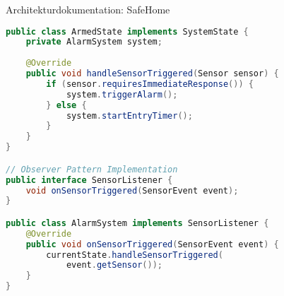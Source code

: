 \begin{example2}[breakable]{Architekturdokumentation: SafeHome}
\begin{lstlisting}[language=Java, style=basesmol]
public class ArmedState implements SystemState {
    private AlarmSystem system;
    
    @Override
    public void handleSensorTriggered(Sensor sensor) {
        if (sensor.requiresImmediateResponse()) {
            system.triggerAlarm();
        } else {
            system.startEntryTimer();
        }
    }
}

// Observer Pattern Implementation
public interface SensorListener {
    void onSensorTriggered(SensorEvent event);
}

public class AlarmSystem implements SensorListener {
    @Override
    public void onSensorTriggered(SensorEvent event) {
        currentState.handleSensorTriggered(
            event.getSensor());
    }
}
\end{lstlisting}
\end{example2}

